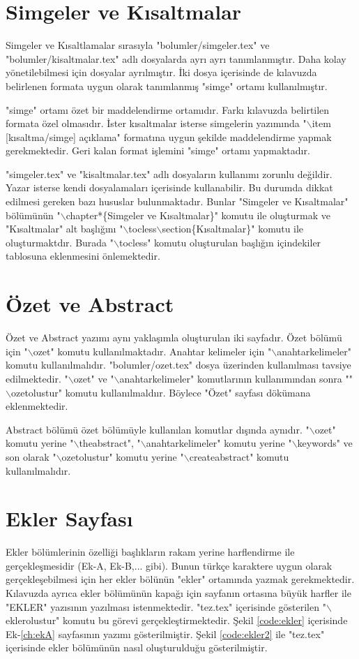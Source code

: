 \chapter{Simgeler ve Kısaltmalar}
\label{ch:simge}
Simgeler ve Kısaltlamalar sırasıyla "bolumler/simgeler.tex" ve "bolumler/kisaltmalar.tex" adlı dosyalarda ayrı ayrı tanımlanmıştır. Daha kolay yönetilebilmesi için dosyalar ayrılmıştır. İki dosya içerisinde de kılavuzda belirlenen formata uygun olarak tanımlanmış "simge" ortamı kullanılmıştır. 

"simge" ortamı özet bir maddelendirme ortamıdır. Farkı kılavuzda belirtilen formata özel olmasıdır. İster kısaltmalar isterse simgelerin yazımında "$\backslash$item [kısaltma/simge] açıklama" formatına uygun şekilde maddelendirme yapmak gerekmektedir. Geri kalan format işlemini "simge" ortamı yapmaktadır. 

"simgeler.tex" ve "kisaltmalar.tex" adlı dosyaların kullanımı zorunlu değildir. Yazar isterse kendi dosyalamaları içerisinde kullanabilir. Bu durumda dikkat edilmesi gereken bazı hususlar bulunmaktadır. Bunlar "Simgeler ve Kısaltmalar" bölümünün "$\backslash$chapter*\{Simgeler ve Kısaltmalar\}" komutu ile oluşturmak ve "Kısaltmalar" alt başlığını "$\backslash$tocless$\backslash$section\{Kısaltmalar\}" komutu ile oluşturmaktdır. Burada "$\backslash$tocless" komutu oluşturulan başlığın içindekiler tablosuna eklenmesini önlemektedir. 

\chapter{Özet ve Abstract}
\label{ch:ozet}
Özet ve Abstract yazımı aynı yaklaşımla oluşturulan iki sayfadır. Özet bölümü için "$\backslash$ozet" komutu kullanılmaktadır. Anahtar kelimeler için "$\backslash$anahtarkelimeler" komutu kullanılmalıdır. "bolumler/ozet.tex" dosya üzerinden kullanılması tavsiye edilmektedir. "$\backslash$ozet" ve "$\backslash$anahtarkelimeler" komutlarının kullanımından sonra ""$\backslash$ozetolustur" komutu kullanılmaldıır. Böylece "Özet" sayfası dökümana eklenmektedir. 

Abstract bölümü özet bölümüyle kullanılan komutlar dışında aynıdır. "$\backslash$ozet" komutu yerine "$\backslash$theabstract", "$\backslash$anahtarkelimeler" komutu yerine "$\backslash$keywords" ve son olarak "$\backslash$ozetolustur" komutu yerine "$\backslash$createabstract" komutu kullanılmalıdır. 


\chapter{Ekler Sayfası}
\label{ch:ek}
Ekler bölümlerinin özelliği başlıkların rakam yerine harflendirme ile gerçekleşmesidir (Ek-A, Ek-B,... gibi). Bunun türkçe karaktere uygun olarak gerçekleşebilmesi için her ekler bölünün "ekler" ortamında yazmak gerekmektedir. Kılavuzda ayrıca ekler bölümünün kapağı için sayfanın ortasına büyük harfler ile "EKLER" yazısının yazılması istenmektedir. "tez.tex" içerisinde gösterilen "$\backslash$eklerolustur" komutu bu görevi gerçekleştirmektedir. Şekil \ref{code:ekler} içerisinde Ek-\ref{ch:ekA} sayfasının yazımı gösterilmiştir. Şekil \ref{code:ekler2} ile "tez.tex" içerisinde ekler bölümünün nasıl oluşturulduğu gösterilmiştir.

